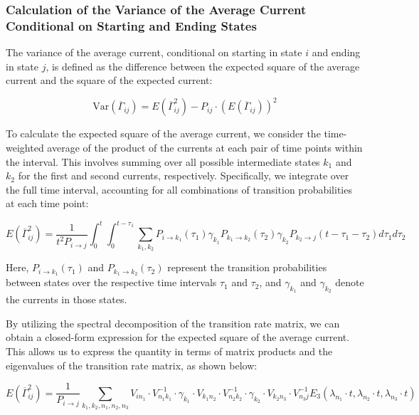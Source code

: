 \documentclass[pdflatex,sn-mathphys-num]{sn-jnl}%
\theoremstyle{thmstyleone}%
\theoremstyle{thmstyletwo}%
\theoremstyle{thmstylethree}%
\begin{document}
\subsubsection{Calculation of the Variance of the Average Current Conditional on Starting and Ending States}

The variance of the average current, conditional on starting in state \(i\) and ending in state \(j\), is defined as the difference between the expected square of the average current and the square of the expected current:

\begin{equation}
	\text{Var}(\overline{\Gamma}_{ij}) = E(\overline{\Gamma}_{ij}^2) - P_{ij} \cdot (E(\overline{\Gamma}_{ij}))^2
\end{equation}

To calculate the expected square of the average current, we consider the time-weighted average of the product of the currents at each pair of time points within the interval. This involves summing over all possible intermediate states \(k_1\) and \(k_2\) for the first and second currents, respectively. Specifically, we integrate over the full time interval, accounting for all combinations of transition probabilities at each time point:

\begin{equation}
	E(\overline{\Gamma}_{ij}^2) = \frac{1}{t^2 P_{i \rightarrow j}} \int_0^t \int_0^{t-\tau_1} \sum_{k_1, k_2} P_{i \rightarrow k_1}(\tau_1) \gamma_{k_1} P_{k_1 \rightarrow k_2}(\tau_2) \gamma_{k_2} P_{k_2 \rightarrow j}(t-\tau_1-\tau_2) d\tau_1 d\tau_2
\end{equation}

Here, \(P_{i \rightarrow k_1}(\tau_1)\) and \(P_{k_1 \rightarrow k_2}(\tau_2)\) represent the transition probabilities between states over the respective time intervals \(\tau_1\) and \(\tau_2\), and \(\gamma_{k_1}\) and \(\gamma_{k_2}\) denote the currents in those states. 

By utilizing the spectral decomposition of the transition rate matrix, we can obtain a closed-form expression for the expected square of the average current. This allows us to express the quantity in terms of matrix products and the eigenvalues of the transition rate matrix, as shown below:

\begin{equation}
	E(\overline{\Gamma}_{ij}^2) = \frac{1}{P_{i \rightarrow j}} \sum_{k_1, k_2, n_1, n_2, n_3} V_{i n_1} \cdot V^{-1}_{n_1 k_1} \cdot \gamma_{k_1} \cdot V_{k_1 n_2} \cdot V^{-1}_{n_2 k_2} \cdot \gamma_{k_2} \cdot V_{k_2 n_3} \cdot V^{-1}_{n_3 j} E_3(\lambda_{n_1} \cdot t, \lambda_{n_2} \cdot t, \lambda_{n_3} \cdot t)
\end{equation}
\end{document}
